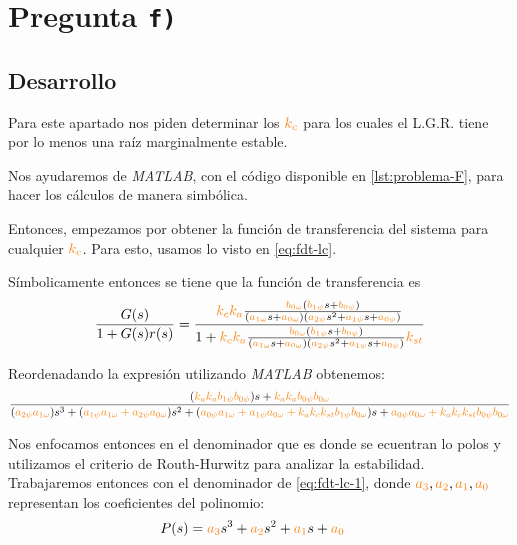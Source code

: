 \section{Pregunta \texttt{f)}}\label{pregunta-f}
\subsection{Desarrollo}

Para este apartado nos piden determinar los $\nara{k_{c}}$ para los cuales el L.G.R. tiene por lo menos una raíz marginalmente estable. 

Nos ayudaremos de \textit{MATLAB}, con
el código disponible en \autoref{lst:problema-F}, para hacer los cálculos
de manera simbólica.

Entonces, empezamos por obtener la función de transferencia del sistema para
cualquier $\nara{k_{c}}$. Para esto, usamos lo visto en \eqref{eq:fdt-lc}.

Símbolicamente entonces se tiene que la función de transferencia es
\begin{equation}
    \frac{G(s)}{1 + G(s)r(s)} = \dfrac{\nara{k_ck_a} \frac{\nara{\nara{b_{0\omega}}}\left(\nara{b_{1\psi}}s + \nara{b_{0\psi}}\right)}
    {\left(\nara{a_{1\omega}}s + \nara{a_{0\omega}}\right)\left(\nara{a_{2\psi}}s^{2} + \nara{a_{1\psi}}s + \nara{a_{0\psi}}\right)}}{1+\nara{k_ck_a} \frac{\nara{\nara{b_{0\omega}}}\left(\nara{b_{1\psi}}s + \nara{b_{0\psi}}\right)}
    {\left(\nara{a_{1\omega}}s + \nara{a_{0\omega}}\right)\left(\nara{a_{2\psi}}s^{2} + \nara{a_{1\psi}}s + \nara{a_{0\psi}}\right)}\nara{k_{st}}}
\end{equation}

Reordenadando la expresión utilizando \textit{MATLAB} obtenemos:
\begin{equation}\label{eq:fdt-lc-1}
    \frac{(\nara{k_a k_a b_{1\psi} b_{0\psi}})s + \nara{k_a k_a b_{0\psi} b_{0\omega}}}
    {(\nara{a_{2\psi} a_{1\omega}})s^3 + (\nara{a_{1\psi} a_{1\omega} + a_{2\psi} a_{0\omega}})s^2 + (\nara{a_{0\psi} a_{1\omega} + a_{1\psi} a_{0\omega} + k_a k_c k_{st} b_{1\psi} b_{0\omega}})s + \nara{a_{0\psi} a_{0\omega} + k_a k_c k_{st} b_{0\psi} b_{0\omega}}}
\end{equation}

Nos enfocamos entonces en el denominador que es donde se ecuentran lo polos y
utilizamos el criterio de Routh-Hurwitz para analizar la estabilidad. Trabajaremos
entonces con el denominador de \eqref{eq:fdt-lc-1}, donde $\nara{a_3},\nara{a_2},\nara{a_1},\nara{a_0}$
representan los coeficientes del polinomio:
\begin{align}
    P(s) = \nara{a_3} s^3 + \nara{a_2} s^2 + \nara{a_1} s + \nara{a_0} &
\end{align}


